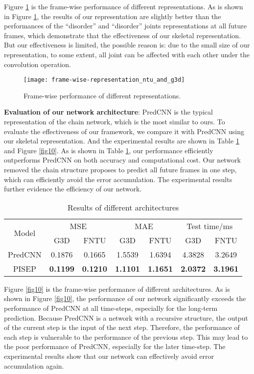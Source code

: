\documentclass[journal]{IEEEtran}
\begin{document}
Figure \ref{fig9} is the frame-wise performance of different representations. As is shown in Figure \ref{fig9}, the results of our representation are slightly better than the performances of the ``disorder'' and ``disorder'' joints representations at all future frames, which demonstrate that the effectiveness of our skeletal representation. But our effectiveness is limited, the possible reason is: due to the small size of our representation, to some extent, all joint can be affected with each other under the convolution operation.

\begin{figure}[!t]
\centering
\texttt{[image: frame-wise-representation\_ntu\_and\_g3d]}
\caption{Frame-wise performance of different representations.}
\label{fig9}
\end{figure}

{\bf Evaluation of our network architecture}: PredCNN \cite{predcnn} is the typical representation of the chain network, which is the most similar to ours. To evaluate the effectiveness of our framework, we compare it with PredCNN using our skeletal representation. And the experimental results are shown in Table \ref{table3} and Figure \ref{fig10}. As is shown in Table \ref{table3}, our performance efficiently outperforms PredCNN on both accuracy and computational cost. Our network removed the chain structure proposes to predict all future frames in one step, which can efficiently avoid the error accumulation. The experimental results further evidence the efficiency of our network.

\begin{table}[!t]
\renewcommand{\arraystretch}{1.3}
\caption{Results of different architectures}
\label{table3}
\centering
\begin{tabular}{ccccccc}
\hline
\multirow{2}{*}{Model}& \multicolumn{2}{c}{MSE} & \multicolumn{2}{c}{MAE} & \multicolumn{2}{c}{Test time/ms} \\
 \cline{2-5}& G3D &FNTU & G3D &FNTU & G3D &FNTU \\
\hline
PredCNN\cite{predcnn}&0.1876&0.1665&1.5539&1.6394&4.3828&3.2649 \\
PISEP&{\bf 0.1199}&{\bf 0.1210}&{\bf 1.1101}&{\bf 1.1651}&{\bf 2.0372}&{\bf 3.1961} \\
\hline
\end{tabular}
\end{table}

Figure \ref{fig10} is the frame-wise performance of different architectures. As is shown in Figure \ref{fig10}, the performance of our network significantly exceeds the performance of PredCNN at all time-steps, especially for the long-term prediction. Because PredCNN is a network with a recursive structure, the output of the current step is the input of the next step. Therefore, the performance of each step is vulnerable to the performance of the previous step. This may lead to the poor performance of PredCNN, especially for the later time-step. The experimental results show that our network can effectively avoid error accumulation again.
\end{document}
